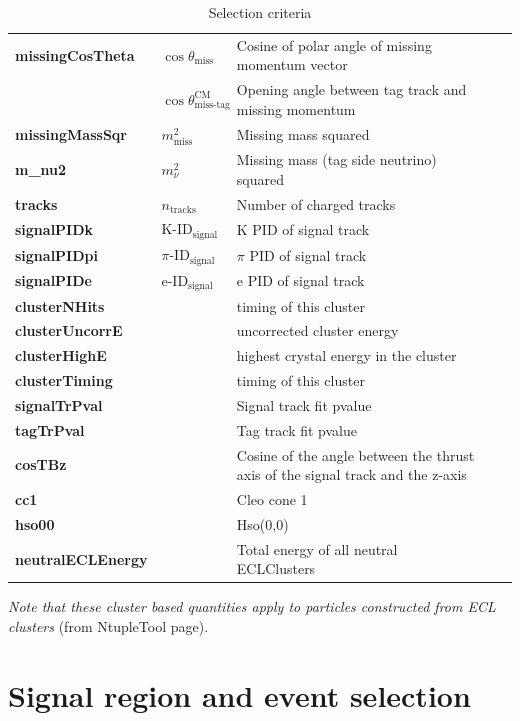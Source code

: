 \documentclass[12pt,a4paper]{article} %
\begin{document}
\begin{table}[h]
\begin{tabular}{lllll}
\textbf{missingCosTheta} & $\cos\theta_{\text{miss}}$ & Cosine of polar angle of missing momentum vector &  &  \\
 & $\cos\theta^{\text{CM}}_{\text{miss-tag}}$ & Opening angle between tag track and missing momentum &  &  \\
\textbf{missingMassSqr} & $m_{\text{miss}}^2$ & Missing mass squared &  &  \\
\textbf{m\_nu2} & $m_{\nu}^2$ & Missing mass (tag side neutrino) squared &  &  \\
\textbf{tracks} & $n_{\text{tracks}}$ & Number of charged tracks &  &  \\
\textbf{signalPIDk} & $\text{K-ID}_{\text{signal}}$ & K PID of signal track &  &  \\
\textbf{signalPIDpi} & $\pi\text{-ID}_{\text{signal}}$ & $\pi$ PID of signal track &  &  \\
\textbf{signalPIDe} & $\text{e-ID}_{\text{signal}}$ & e PID of signal track &  &  \\
\textbf{clusterNHits} &  & timing of this cluster &  &  \\
\textbf{clusterUncorrE} &  & uncorrected cluster energy &  &  \\
\textbf{clusterHighE} &  & highest crystal energy in the cluster &  &  \\
\textbf{clusterTiming} &  & timing of this cluster &  &  \\
\textbf{signalTrPval} &  & Signal track fit pvalue &  &  \\
\textbf{tagTrPval} &  & Tag track fit pvalue &  &  \\
\textbf{cosTBz} &  & Cosine of the angle between the thrust axis of the signal track and the z-axis &  &  \\
\textbf{cc1} &  & Cleo cone 1 &  &  \\
\textbf{hso00} &  & Hso(0,0) &  &  \\
\textbf{neutralECLEnergy} &  & Total energy of all neutral ECLClusters &  & 
\end{tabular}
\caption{Selection criteria}
\label{my-label}
\end{table}

\emph{Note that these cluster based quantities apply to particles constructed from ECL clusters} (from NtupleTool page).


\pagebreak


\section{Signal region and event selection}
\end{document}
